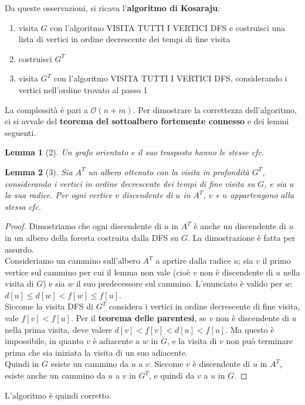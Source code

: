 \documentclass[11pt]{article}
\newtheorem*{lemma}{Lemma}
\theoremstyle{proprietà}
\begin{document}
Da queste osservazioni, si ricava l'\textbf{algoritmo di Kosaraju}: 
\begin{enumerate}
    \item visita $G$ con l'algoritmo VISITA TUTTI I VERTICI DFS e costruisci una lista di vertici in ordine decrescente 
    dei tempi di fine visita 
    \item costruisci $G^T$
    \item visita $G^T$ con l'algoritmo VISITA TUTTI I VERTICI DFS, considerando i vertici nell'ordine trovato al passo 1 
\end{enumerate}
La complessità è pari a $\mathcal{O}(n+m)$.
Per dimostrare la correttezza dell'algoritmo, ci si avvale del \textbf{teorema del sottoalbero fortemente connesso} e dei 
lemmi seguenti.
\begin{lemma}[2]
    Un grafo orientato e il suo trasposto hanno le stesse cfc.
\end{lemma}
\begin{lemma}[3]
    Sia $A^T$ un albero ottenuto con la visita in profondità $G^T$, considerando i vertici in ordine decrescente dei tempi 
    di fine visita su $G$, e sia $u$ la sua radice. Per ogni vertice $v$ discendente di $u$ in $A^T$, $v$ e $u$ appartengono 
    alla stessa cfc.
\end{lemma}
\begin{proof}
    Dimostriamo che ogni discendente di $u$ in $A^T$ è anche un discendente di $u$ in un albero della foresta costruita 
    dalla DFS su $G$. La dimostrazione è fatta per assurdo.\\
    Consideriamo un cammino sull'albero $A^T$ a aprtire dalla radice $u$; sia $v$ il primo vertice sul cammino per cui il 
    lemma non vale (cioè $v$ non è discendente di $u$ nella visita di $G$) e sia $w$ il suo predecessore sul cammino. 
    L'enunciato è valido per $w$: $d[u]\leq d[w]<f[w]\leq f[u]$.\\
    Siccome la visita DFS di $G^T$ considera i vertici in ordine decrescente di fine visita, vale $f[v]<f[u]$.
    Per il \textbf{teorema delle parentesi}, se $v$ non è discendente di $u$ nella prima visita, deve valere $d[v]<f[v]<d[u]<f[u]$.
    Ma questo è impossibile, in quanto $v$ è adiacente a $w$ in $G$, e la visita di $v$ non può terminare prima che sia 
    iniziata la visita di un suo adiacente.\\
    Quindi in $G$ esiste un cammino da $u$ a $v$. Siccome $v$ è discendente di $u$ in $A^T$, esiste anche un cammino da 
    $u$ a $v$ in $G^T$, e quindi da $v$ a $u$ in $G$.
\end{proof}
L'algoritmo è quindi corretto.
\end{document}
